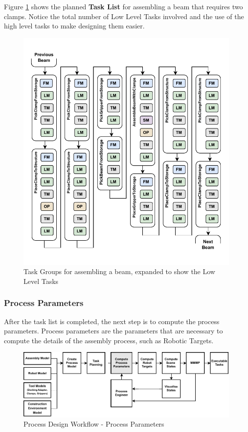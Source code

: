 Figure \ref{fig:task-group-expanded} shows the planned \textbf{Task List} for assembling a beam that requires two clamps. Notice the total number of Low Level Tasks involved and the use of the high level tasks to make designing them easier.

\begin{figure}[!h]
    \centering
    \includegraphics[width=0.99\textwidth]{images/6a/expand-to-low-level-task.pdf}
    \caption{Task Groups for assembling a beam, expanded to show the Low Level Tasks}
    \label{fig:task-group-expanded}
\end{figure}

\FloatBarrier

\subsubsection{Process Parameters}
\label{subsubsection:exploration-3-process-parameters}

After the task list is completed, the next step is to compute the process parameters. Process parameters are the parameters that are necessary to compute the details of the assembly process, such as Robotic Targets.

\begin{figure}[!h]
    \centering
    \includegraphics[width=0.99\textwidth]{images/6a/process_3.pdf}
    \caption{Process Design Workflow - Process Parameters}
    \label{fig:process-design-3}
\end{figure}

